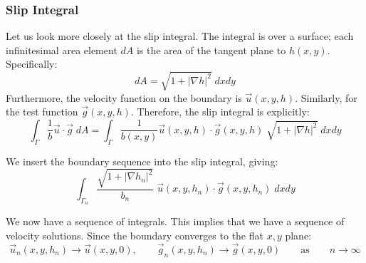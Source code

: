 \documentclass[a4paper]{report}
\begin{document}
\begin{center}
\end{center}

\subsubsection*{Slip Integral}

Let us look more closely at the slip integral.  The integral is over a surface; each infinitesimal area element $dA$ is the area of the tangent plane to $h(x,y)$. Specifically:
\begin{equation}
dA = \sqrt{1 + \lvert \nabla h \rvert^2} \;dxdy
\end{equation}
Furthermore, the velocity function on the boundary is $\vec{u}(x,y,h)$.  Similarly, for the test function $\vec{g}(x,y,h)$.
Therefore, the slip integral is explicitly:
\begin{equation}
\int_{\Gamma} \frac{1}{b} \vec{u} \cdot \vec{g} \;dA =
\int_{\Gamma} \frac{1}{b(x,y)} \vec{u}(x,y,h) \cdot \vec{g}(x,y,h) 
\;\sqrt{1 + \lvert \nabla h \rvert^2} \;dxdy
\end{equation}

We insert the boundary sequence into the slip integral, giving:
\begin{equation}
\int_{\Gamma_n} \frac{\sqrt{1 + \lvert \nabla h_n \rvert^2}}{b_n} \;
 \vec{u}(x,y,h_n) \cdot \vec{g}(x,y,h_n) \;dxdy
\end{equation}

We now have a sequence of integrals.  This implies that we have a sequence of velocity solutions.  Since the boundary converges to the flat $x,y$ plane:
\begin{equation}
\vec{u}_n(x,y,h_n) \to \vec{u}(x,y,0), \qquad \vec{g}_n(x,y,h_n) \to \vec{g}(x,y,0)
\qquad \text{as} \qquad n \to \infty
\end{equation}
\end{document}

